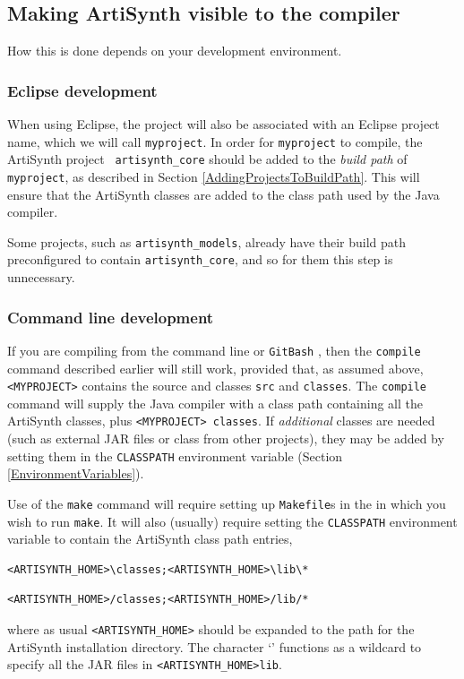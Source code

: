 \subsection{Making ArtiSynth visible to the compiler}

How this is done depends on your development environment.

\subsubsection{Eclipse development}

When using Eclipse, the project will also be associated with an
Eclipse project name, which we will call {\tt myproject}.  In order
for {\tt myproject} to compile, the ArtiSynth project {\tt
artisynth\_core} should be added to the {\it build path} of {\tt
myproject}, as described in
Section \ref{AddingProjectsToBuildPath}. This will ensure that the
ArtiSynth classes are added to the class path used by the Java
compiler.

\begin{sideblock}
Some projects, such as {\tt artisynth\_models}, already have their
build path preconfigured to contain {\tt artisynth\_core}, and so for
them this step is unnecessary.
\end{sideblock}

\subsubsection{Command line development}
\label{CommandLineDevel}

If you are compiling from the command line 
\ifWindows
or {\tt GitBash}%
\fi
, then the {\tt compile} command described earlier will still work,
provided that, as assumed above, {\tt <MYPROJECT>} contains the source
and classes \directories{} {\tt src\SEP} and {\tt classes\SEP}. The
{\tt compile} command will supply the Java compiler with a class path
containing all the ArtiSynth classes, plus {\tt <MYPROJECT>\SEP
classes}. If {\it additional} classes are needed (such as external
JAR files or class \directories{} from other projects), they
may be added by setting them in the {\tt CLASSPATH} environment
variable (Section \ref{EnvironmentVariables}).

Use of the {\tt make} command will require setting up {\tt Makefile}s
in the \directories{} in which you wish to run {\tt make}. It will
also (usually) require setting the {\tt CLASSPATH} environment
variable to contain the ArtiSynth
class path entries,
\ifWindows
\begin{verbatim}
<ARTISYNTH_HOME>\classes;<ARTISYNTH_HOME>\lib\*
\end{verbatim}
\else
\begin{verbatim}
<ARTISYNTH_HOME>/classes;<ARTISYNTH_HOME>/lib/*
\end{verbatim}
\fi
where as usual {\tt <ARTISYNTH\_HOME>} should be expanded to the path
for the ArtiSynth installation directory.  The character `{\tt *}'
functions as a wildcard to specify all the JAR files in
{\tt <ARTISYNTH\_HOME>\SEP lib}.

